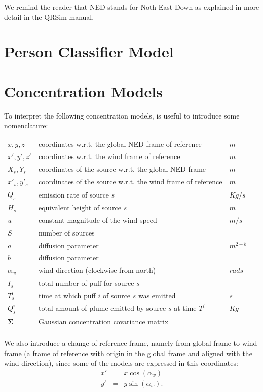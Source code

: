 \documentclass[a4paper,11pt]{report}
\newcommand{\sname}{QRSim\xspace}
\begin{document}
We remind the reader that NED stands for Noth-East-Down as explained in more detail in the \sname manual.

\newpage

\chapter{Person Classifier Model} \label{personclassifier}

\newpage

\chapter{Concentration Models}

To interpret the following concentration models, is useful to introduce some nomenclature:
\begin{longtable}{l l l}
$x,y,z$ & coordinates w.r.t. the global NED frame of reference & $m$\\
$x',y',z'$ & coordinates w.r.t. the wind frame of reference & $m$\\
$X_s,Y_s$ & coordinates of the source w.r.t. the global NED frame  & $m$\\
$x\prime_s,y'_s$ & coordinates of the source w.r.t. the wind frame of reference  & $m$\\
$Q_s$ & emission rate of source $s$ & $Kg/s$\\
$H_s$ & equivalent height of source $s$ & $m$\\
$u$ & constant magnitude of the wind speed & $m/s$\\
$S$ & number of sources & \\
$a$ & diffusion parameter & $m^{2-b}$\\
$b$ & diffusion parameter & \\
$\alpha_w$ & wind direction (clockwise from north) & $rads$\\
$I_s$ & total number of puff for source $s$ & \\
$T^i_s$ & time at which puff $i$ of source $s$ was emitted & $s$\\
$Q^i_s$ & total amount of plume emitted by source $s$ at time $T^i$ & $Kg$\\
$\boldsymbol\Sigma$ & Gaussian concentration covariance matrix \\
\label{tab:naming2}
\end{longtable}

We also introduce a change of reference frame, namely from global frame to wind frame (a frame of reference with origin in the global frame and aligned with the wind direction), since some of the models are expressed in this coordinates:
\begin{eqnarray}
x' &=& x \cos(\alpha_w) \\
y' &=& y \sin(\alpha_w).
\end{eqnarray}
\end{document}
